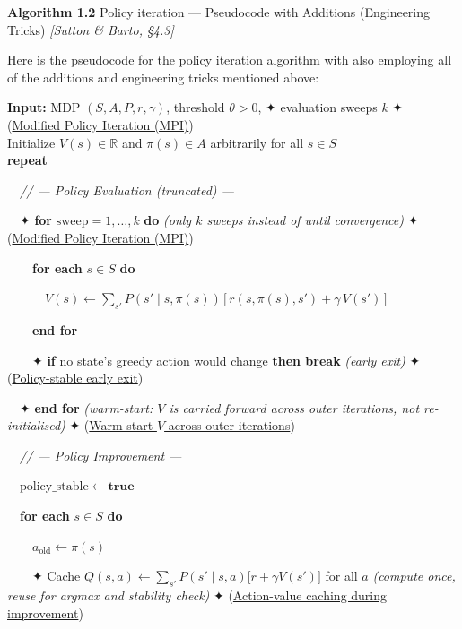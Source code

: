 \documentclass[11pt]{article}
\begin{document}
    \begin{pseudobox}

\textbf{Algorithm 1.2} Policy iteration --- Pseudocode with Additions
(Engineering Tricks) \emph{{[}Sutton \& Barto, §4.3{]}}

\tcbline

Here is the pseudocode for the policy iteration algorithm with also
employing all of the additions and engineering tricks mentioned above:

\textbf{Input:} MDP \((S, A, P, r, \gamma)\), threshold \(\theta > 0\),
✦ evaluation sweeps \(k\) ✦ (\hyperref[trick-1-2-1]{Modified Policy
Iteration (MPI)})\\
Initialize \(V(s) \in \mathbb{R}\) and \(\pi(s) \in A\) arbitrarily for
all \(s \in S\)\\
\textbf{repeat}\\
\strut ~~\emph{// --- Policy Evaluation (truncated) ---}\\
\strut ~~✦ \textbf{for} \(\text{sweep} = 1, \ldots, k\) \textbf{do}
\emph{(only \(k\) sweeps instead of until convergence)} ✦
(\hyperref[trick-1-2-1]{Modified Policy Iteration (MPI)})\\
\strut ~~~~\textbf{for each} \(s \in S\) \textbf{do}\\
\strut ~~~~~~\(V(s) \leftarrow \sum_{s'} P(s' \mid s, \pi(s))\,\bigl[\, r(s, \pi(s), s') + \gamma\, V(s') \,\bigr]\)\\
\strut ~~~~\textbf{end for}\\
\strut ~~~~✦ \textbf{if} no state's greedy action would change
\textbf{then break} \emph{(early exit)} ✦
(\hyperref[trick-1-2-5]{Policy-stable early exit})\\
\strut ~~✦ \textbf{end for} \emph{(warm-start: \(V\) is carried forward
across outer iterations, not re-initialised)} ✦
(\hyperref[trick-1-2-3]{Warm-start \(V\) across outer iterations})\\
\strut ~~\emph{// --- Policy Improvement ---}\\
\strut ~~\(\text{policy\_stable} \leftarrow \mathbf{true}\)\\
\strut ~~\textbf{for each} \(s \in S\) \textbf{do}\\
\strut ~~~~\(a_{\text{old}} \leftarrow \pi(s)\)\\
\strut ~~~~✦ Cache
\(Q(s,a) \leftarrow \sum_{s'} P(s'\mid s,a)\bigl[r + \gamma V(s')\bigr]\)
for all \(a\) \emph{(compute once, reuse for argmax and stability
check)} ✦ (\hyperref[trick-1-2-4]{Action-value caching during
improvement})\\

\end{pseudobox}
\end{document}
